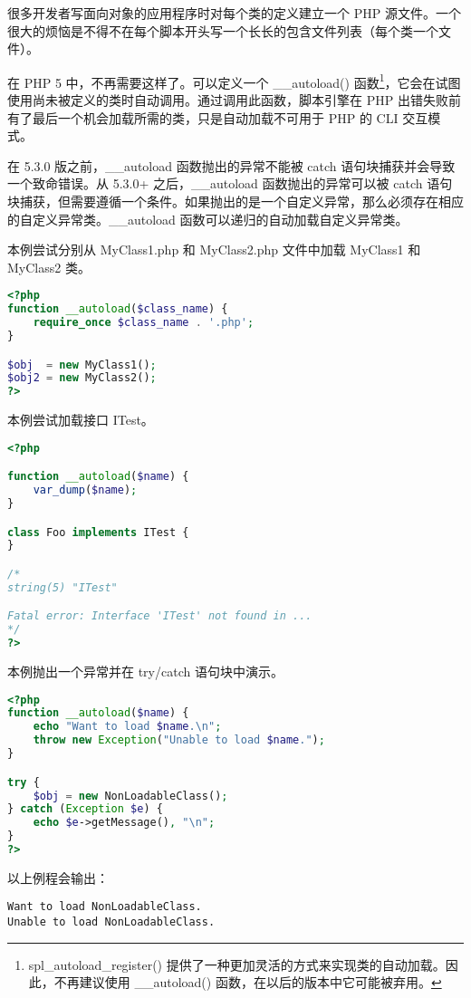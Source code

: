 很多开发者写面向对象的应用程序时对每个类的定义建立一个 PHP 源文件。一个很大的烦恼是不得不在每个脚本开头写一个长长的包含文件列表（每个类一个文件）。

在 PHP 5 中，不再需要这样了。可以定义一个 \_\_autoload() 函数\footnote{spl\_autoload\_register() 提供了一种更加灵活的方式来实现类的自动加载。因此，不再建议使用 \_\_autoload() 函数，在以后的版本中它可能被弃用。}，它会在试图使用尚未被定义的类时自动调用。通过调用此函数，脚本引擎在 PHP 出错失败前有了最后一个机会加载所需的类，只是自动加载不可用于 PHP 的 CLI 交互模式。

在 5.3.0 版之前，\_\_autoload 函数抛出的异常不能被 catch 语句块捕获并会导致一个致命错误。从 5.3.0+ 之后，\_\_autoload 函数抛出的异常可以被 catch 语句块捕获，但需要遵循一个条件。如果抛出的是一个自定义异常，那么必须存在相应的自定义异常类。\_\_autoload 函数可以递归的自动加载自定义异常类。

本例尝试分别从 MyClass1.php 和 MyClass2.php 文件中加载 MyClass1 和 MyClass2 类。

\begin{lstlisting}[language=PHP]
<?php
function __autoload($class_name) {
    require_once $class_name . '.php';
}

$obj  = new MyClass1();
$obj2 = new MyClass2();
?>
\end{lstlisting}


本例尝试加载接口 ITest。


\begin{lstlisting}[language=PHP]
<?php

function __autoload($name) {
    var_dump($name);
}

class Foo implements ITest {
}

/*
string(5) "ITest"

Fatal error: Interface 'ITest' not found in ...
*/
?>
\end{lstlisting}

本例抛出一个异常并在 try/catch 语句块中演示。




\begin{lstlisting}[language=PHP]
<?php
function __autoload($name) {
    echo "Want to load $name.\n";
    throw new Exception("Unable to load $name.");
}

try {
    $obj = new NonLoadableClass();
} catch (Exception $e) {
    echo $e->getMessage(), "\n";
}
?>
\end{lstlisting}

以上例程会输出：

\begin{verbatim}
Want to load NonLoadableClass.
Unable to load NonLoadableClass.
\end{verbatim}

